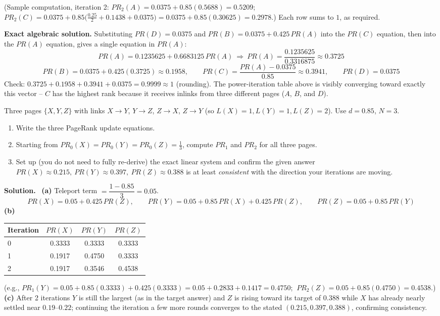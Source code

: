 \documentclass[11pt, a4paper]{article}
\newcommand{\Solution}{\medskip\noindent\textbf{\color{exgreen}Solution.}\ }
\begin{document}
\begin{examplebox}
(Sample computation, iteration 2: $PR_2(A)=0.0375+0.85(0.5688)=0.5209$; \ $PR_2(C)=0.0375+0.85\big(\tfrac{0.25}{2}+0.1438+0.0375\big)=0.0375+0.85(0.30625)=0.2978$.) Each row sums to $1$, as required.

\textbf{Exact algebraic solution.} Substituting $PR(D)=0.0375$ and $PR(B)=0.0375+0.425\,PR(A)$ into the $PR(C)$ equation, then into the $PR(A)$ equation, gives a single equation in $PR(A)$:
\[
PR(A) = 0.1235625 + 0.6683125\,PR(A) \ \Longrightarrow\ PR(A) = \frac{0.1235625}{0.3316875} \approx 0.3725
\]
\[
PR(B) = 0.0375+0.425(0.3725)\approx0.1958, \qquad PR(C) = \frac{PR(A)-0.0375}{0.85}\approx0.3941, \qquad PR(D)=0.0375
\]
Check: $0.3725+0.1958+0.3941+0.0375 = 0.9999\approx1$ (rounding). The power-iteration table above is visibly converging toward exactly this vector -- $C$ has the highest rank because it receives inlinks from three different pages ($A$, $B$, and $D$).
\end{examplebox}

\begin{exercisebox}
Three pages $\{X,Y,Z\}$ with links $X\to Y$, $Y\to Z$, $Z\to X$, $Z\to Y$ (so $L(X)=1, L(Y)=1, L(Z)=2$). Use $d=0.85$, $N=3$.
\begin{enumerate}[label=(\alph*)]
  \item Write the three PageRank update equations.
  \item Starting from $PR_0(X)=PR_0(Y)=PR_0(Z)=\tfrac13$, compute $PR_1$ and $PR_2$ for all three pages.
  \item Set up (you do not need to fully re-derive) the exact linear system and confirm the given answer $PR(X)\approx0.215,\ PR(Y)\approx0.397,\ PR(Z)\approx0.388$ is at least \emph{consistent} with the direction your iterations are moving.
\end{enumerate}
\end{exercisebox}

\Solution
\textbf{(a)} Teleport term $=\dfrac{1-0.85}{3}=0.05$.
\[
PR(X) = 0.05 + 0.425\,PR(Z), \qquad PR(Y) = 0.05 + 0.85\,PR(X) + 0.425\,PR(Z), \qquad PR(Z) = 0.05+0.85\,PR(Y)
\]
\textbf{(b)}
\begin{center}
\begin{tabular}{@{}lccc@{}}
\toprule
Iteration & $PR(X)$ & $PR(Y)$ & $PR(Z)$ \\
\midrule
0 & 0.3333 & 0.3333 & 0.3333 \\
1 & 0.1917 & 0.4750 & 0.3333 \\
2 & 0.1917 & 0.3546 & 0.4538 \\
\bottomrule
\end{tabular}
\end{center}
(e.g., $PR_1(Y) = 0.05+0.85(0.3333)+0.425(0.3333) = 0.05+0.2833+0.1417=0.4750$; $\ PR_2(Z)=0.05+0.85(0.4750)=0.4538$.)\\
\textbf{(c)} After 2 iterations $Y$ is still the largest (as in the target answer) and $Z$ is rising toward its target of $0.388$ while $X$ has already nearly settled near $0.19$--$0.22$; continuing the iteration a few more rounds converges to the stated $(0.215, 0.397, 0.388)$, confirming consistency.
\end{document}
